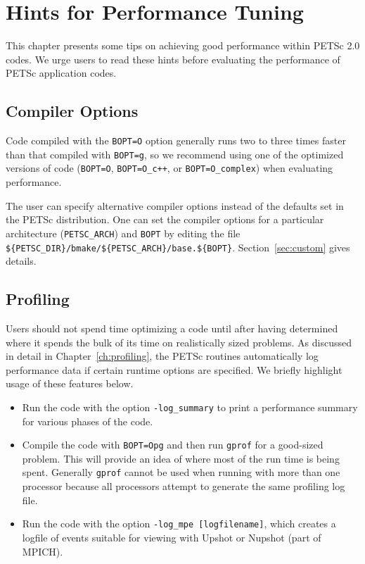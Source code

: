 \chapter{Hints for Performance Tuning} 
\label{ch:performance} 

This chapter presents some tips on achieving good performance within
PETSc 2.0 codes.  We urge users to read these hints before
evaluating the performance of PETSc application codes.

\section{Compiler Options}

Code compiled with the {\tt BOPT=O} option generally runs two to three times
faster than that compiled with {\tt BOPT=g}, so we recommend using one
of the optimized versions of code ({\tt BOPT=O}, {\tt BOPT=O\_c++}, or
{\tt BOPT=O\_complex}) when evaluating performance.

The user can specify alternative compiler options instead of
the defaults set in the PETSc distribution.  One can set
the compiler options for a particular architecture
({\tt PETSC\_ARCH}) and {\tt BOPT} by editing the file
{\tt \$\{PETSC\_DIR\}/bmake/\$\{PETSC\_ARCH\}/base.\$\{BOPT\}}.
Section~\ref{sec:custom} gives details.

\section{Profiling}
  

Users should not spend time optimizing a code until after having determined
where it spends the bulk of its time on realistically sized problems.
As discussed in detail in Chapter~\ref{ch:profiling}, the PETSc
routines automatically log performance data if certain runtime options
are specified.  We briefly highlight usage of these features below.

\begin{itemize}
\item Run the code with the option {\tt -log\_summary} to print a performance
   summary for various phases of the code. 

\item Compile the code with {\tt BOPT=Opg} and then run {\tt gprof} for a good-sized 
   problem.  This will provide an idea of where most of the run time is being spent. 
   Generally {\tt gprof} cannot be used when running with more than one processor because
   all processors attempt to generate the same profiling log file.

\item Run the code with the option {\tt -log\_mpe [logfilename]}, which creates a
   logfile of events suitable for viewing with Upshot or Nupshot (part of
   MPICH). 

\end{itemize}

